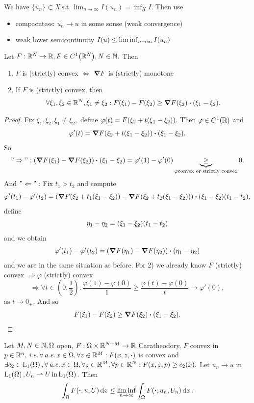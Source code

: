 \documentclass{article}
\begin{document}
\begin{remark}
	We have $\{u_n\}\subset X \, \text{s.t.} \, \lim_{n\to \infty} I(u_n) = \inf_X I.$ Then use
	\begin{itemize}
		\item compacntess: $u_n \to u$ in some sonse (weak convergence)
		\item weak lower semicontinuity $I(u) \leq \liminf_{n\to \infty}I\qty(u_n)$
	\end{itemize}
\end{remark}

\begin{lemma}
	Let $F: {\mathbb R}^N \to {\mathbb R}, F \in C^1\qty({\mathbb R}^N), N \in {\mathbb N}.$ Then 
	\begin{enumerate}
		\item $F$ is (strictly) convex $\Leftrightarrow$ $\grad F$ is (strictly) monotone
		\item If $F$ is (strictly) convex, then
			\[
				\forall \xi_1, \xi_2 \in \R^N, \xi_1 \neq \xi_2: F\qty(\xi_1)-F\qty(\xi_2)\geq \grad F\qty(\xi_2)\vdot \qty(\xi_1 - \xi_2).
			\]
	\end{enumerate}
\end{lemma}
\begin{proof}
	Fix $\xi_1, \xi_2, \xi_1 \neq \xi_2,$ define $\varphi(t) = F\qty(\xi_2 + t\qty(\xi_1 - \xi_2)).$ Then $\varphi \in C^1\qty({\mathbb R})$ and
	\[
		\varphi'(t) = \grad F\qty(\xi_2 +t\qty(\xi_1 - \xi_2))\vdot \qty(\xi_1 - \xi_2).
	\]
	So
	\[
		"\Rightarrow": \qty(\grad F\qty(\xi_1) - \grad F\qty(\xi_2))\vdot\qty(\xi_1-\xi_2) = \varphi'(1)-\varphi'(0) \underbrace{\geq}_{\varphi \text{convex or strictly convex}} 0.
	\]
	And $"\Leftarrow":$ Fix $t_1 > t_2$ and compute
	\[
		\varphi'\qty(t_1) - \varphi'\qty(t_2) = \qty(\grad F\qty(\xi_2 + t_1\qty(\xi_1 - \xi_2))- \grad F\qty(\xi_2 + t_2\qty(\xi_1-\xi_2)))\vdot\qty(\xi_1-\xi_2)\qty(t_1-t_2),
	\]
	define
	\[
		\eta_1 - \eta_2 = \qty(\xi_1 - \xi_2)\qty(t_1-t_2)
	\]
	and we obtain
	\[
		\varphi'(t_1) - \varphi'(t_2) = \qty(\grad F\qty(\eta_1)-\grad F\qty(\eta_2))\vdot \qty(\eta_1 - \eta_2)
	\]
	and we are in the same situation as before. For 2) we already know $F$ (strictly) convex $\Rightarrow \varphi$ (strictly) convex
	\[
		\Rightarrow \forall t \in (0,\frac{1}{2}): \frac{\varphi(1)-\varphi(0)}{1} \geq \frac{\varphi(t)-\varphi(0)}{t}\to \varphi'(0),
	\]
	as $t\to 0_+.$ And so
	\[
		F\qty(\xi_1) - F\qty(\xi_2) \geq \grad F\qty(\xi_2)\vdot \qty(\xi_1 - \xi_2).
	\]
\end{proof}

\begin{theorem}
	Let $M,N \in {\mathbb N}, \Omega$ open, $F: \Omega \times {\mathbb R}^{N+M} \to {\mathbb R}$ Caratheodory, $F$ convex in $p \in \R^{n}, \, \text{\textit{i.e.}} \, \forall \, \text{\textit{a.e.}} \,x \in \Omega, \forall z \in \R^{M}: F\qty(x,z,\vdot)$ is convex and $\exists c_2 \in \LpSet[1]{\Omega}, \forall\, \text{\textit{a.e.}} \, x \in \Omega, \forall z \in \R^{M}, \forall p \in \R^{N}: F\qty(x,z,p)\geq c_2(x).$ Let $u_n \to u$ in $\LpSet[1]{\Omega}, U_n \rightharpoonup U \, \text{in} \, \LpSet[1]{\Omega}.$ Then
	\[
		\int_{\Omega}F\qty(\vdot,u,U)\dd{x} \leq \liminf_{n\to \infty} \int_{\Omega}F\qty(\vdot, u_n, U_n) \dd{x}.
	\]
\end{theorem}
\end{document}
